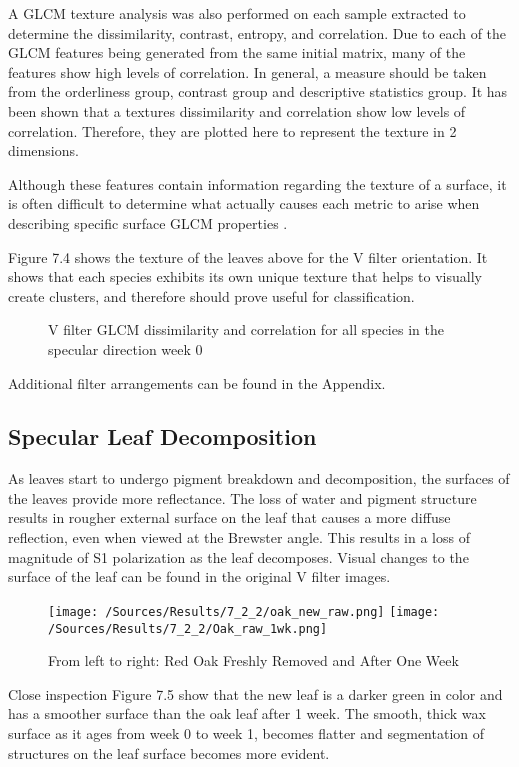 A GLCM texture analysis was also performed on each sample extracted to determine the dissimilarity, contrast, entropy, and correlation. Due to each of the GLCM features being generated from the same initial matrix, many of the features show high levels of correlation.  In general, a measure should be taken from the orderliness group, contrast group and descriptive statistics group. It has been shown that a textures dissimilarity and correlation show low levels of correlation.  Therefore, they are plotted here to represent the texture in 2 dimensions.

Although these features contain information regarding the texture of a surface, it is often difficult to determine what actually causes each metric to arise when describing specific surface GLCM properties \cite{haralick}.

Figure 7.4 shows the texture of the leaves above for the V filter orientation.  It shows that each species exhibits its own unique texture that helps to visually create clusters, and therefore should prove useful for classification.
%
\begin{figure}
    \begin{center}
    \end{center}
    \caption{V filter GLCM dissimilarity and correlation for all species in the specular direction week 0}
    \label{fig:polarization}
\end{figure}
%
Additional filter arrangements can be found in the Appendix.

\subsection{Specular Leaf Decomposition}
As leaves start to undergo pigment breakdown and decomposition, the surfaces of the leaves provide more reflectance.  The loss of water and pigment structure results in rougher external surface on the leaf that causes a more diffuse reflection, even when viewed at the Brewster angle.  This results in a loss of magnitude of S1 polarization as the leaf decomposes.  Visual changes to the surface of the leaf can be found in the original V filter images.
%
\begin{figure}[htp]
    \centering
    \hspace*{\fill}%
    \texttt{[image: /Sources/Results/7\_2\_2/oak\_new\_raw.png]}\hfill%
    \texttt{[image: /Sources/Results/7\_2\_2/Oak\_raw\_1wk.png]}
    \hspace*{\fill}%
    \caption{From left to right: Red Oak Freshly Removed and After One Week}
    \label{fig:specular-raw-decompose}
\end{figure}
%
Close inspection Figure 7.5 show that the new leaf is a darker green in color and has a smoother surface than the oak leaf after 1 week.  The smooth, thick wax surface as it ages from week 0 to week 1, becomes flatter and segmentation of structures on the leaf surface becomes more evident.

